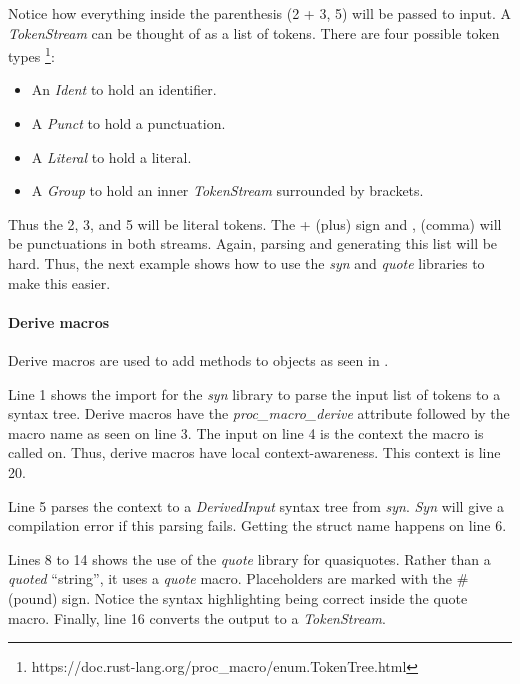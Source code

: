 Notice how everything inside the parenthesis (\colorbox{input}{2 + 3, 5}) will be passed to \colorbox{input}{input}.
A \textit{TokenStream} can be thought of as a list of tokens.
There are four possible token types \footnote{https://doc.rust-lang.org/proc\_macro/enum.TokenTree.html}:

\begin{itemize}
	\item An \textit{Ident} to hold an identifier.
	\item A \textit{Punct} to hold a punctuation.
	\item A \textit{Literal} to hold a literal.
	\item A \textit{Group} to hold an inner \textit{TokenStream} surrounded by brackets.
\end{itemize}

Thus the 2, 3, and 5 will be literal tokens.
The + (plus) sign and , (comma) will be punctuations in both streams.
Again, parsing and generating this list will be hard.
Thus, the next example shows how to use the \textit{syn} and \textit{quote} libraries to make this easier.

\paragraph{Derive macros}
Derive macros are used to add methods to objects as seen in .


Line 1 shows the import for the \textit{syn} library to parse the input list of tokens to a syntax tree.
Derive macros have the \textit{proc\_macro\_derive} attribute followed by the macro \colorbox{function}{name} as seen on line 3.
The \colorbox{context}{input} on line 4 is the context the macro is called on.
Thus, derive macros have local context-awareness.
This \colorbox{context}{context} is line 20.

Line 5 parses the context to a \textit{DerivedInput} syntax tree from \textit{syn}.
\textit{Syn} will give a compilation error if this parsing fails.
Getting the struct name happens on line 6.

Lines 8 to 14 shows the use of the \textit{quote} library for quasiquotes.
Rather than a \textit{quoted} ``string'', it uses a \textit{quote} macro.
Placeholders are marked with the \# (pound) sign.
Notice the syntax highlighting being correct inside the quote macro.
Finally, line 16 converts the output to a \textit{TokenStream}.

